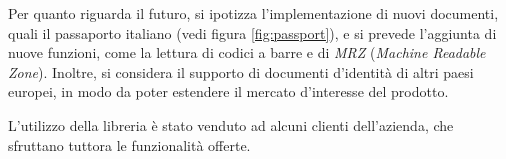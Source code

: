 Per quanto riguarda il futuro, si ipotizza l'implementazione di nuovi documenti, quali il passaporto italiano (vedi figura \ref{fig:passport}), e si prevede l'aggiunta di nuove funzioni, come la lettura di codici a barre e di \textit{MRZ} (\textit{Machine Readable Zone}). Inoltre, si considera il supporto di documenti d'identit\`a di altri paesi europei, in modo da poter estendere il mercato d'interesse del prodotto.\par
L'utilizzo della libreria \`e stato venduto ad alcuni clienti dell'azienda, che sfruttano tuttora le funzionalit\`a offerte.
